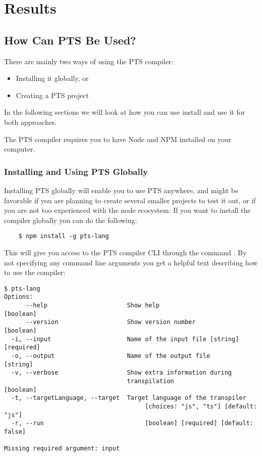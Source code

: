 \chapter{Results}\label{ch:results}

\section{How Can PTS Be Used?}\label{sec:how-can-this-be-used?}

There are mainly two ways of using the PTS compiler:

\begin{itemize}
    \item Installing it globally, or
    \item Creating a PTS project
\end{itemize}

In the following sections we will look at how you can use install and use it for both approaches.

The PTS compiler requires you to have Node and NPM installed on your computer.

\subsection{Installing and Using PTS Globally}\label{subsec:installing-and-using-pts-globally}

Installing PTS globally will enable you to use PTS anywhere, and might be favorable if you are planning to create several smaller projects to test it out, or if you are not too experienced with the node ecosystem.
If you want to install the compiler globally you can do the following:

\begin{verbatim}
    $ npm install -g pts-lang
\end{verbatim}

This will give you access to the PTS compiler CLI through the command .
By not specifying any command line arguments you get a helpful text describing how to use the compiler:

\begin{verbatim}
$ pts-lang
Options:
      --help                      Show help                        [boolean]
      --version                   Show version number              [boolean]
  -i, --input                     Name of the input file [string] [required]
  -o, --output                    Name of the output file           [string]
  -v, --verbose                   Show extra information during
                                  transpilation                    [boolean]
  -t, --targetLanguage, --target  Target language of the transpiler
                                       [choices: "js", "ts"] [default: "js"]
  -r, --run                            [boolean] [required] [default: false]

Missing required argument: input
\end{verbatim}

